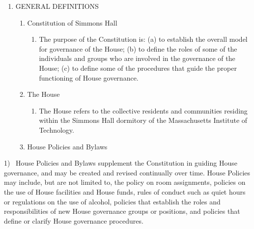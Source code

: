\documentclass[letterpaper]{article}
\newcounter{saveenum}
\newcommand\liststyleWWNumv{%
\renewcommand\theenumi{\Roman{enumi}}
\renewcommand\theenumii{\arabic{enumii}}
\renewcommand\theenumiii{\arabic{enumiii}}
\renewcommand\theenumiv{\arabic{enumiv}}
\renewcommand\labelenumi{\theenumi.}
\renewcommand\labelenumii{\theenumii.}
\renewcommand\labelenumiii{\theenumiii)}
\renewcommand\labelenumiv{\theenumiv.}
}
\begin{document}
\clearpage
\liststyleWWNumv
\setcounter{saveenum}{\value{enumi}}
\begin{enumerate}
\setcounter{enumi}{\value{saveenum}}
\item GENERAL DEFINITIONS 

\begin{enumerate}
\item Constitution of Simmons Hall 

\begin{enumerate}
\item The purpose of the Constitution is: (a) to establish the overall
model for governance of the House; (b) to define the roles of some of
the individuals and groups who are involved in the governance of the
House; (c) to define some of the procedures that guide the proper
functioning of House governance.
\end{enumerate}
\item The House 

\begin{enumerate}
\item The House refers to the collective residents and communities
residing within the Simmons Hall dormitory of the Massachusetts
Institute of Technology. 
\end{enumerate}
\item House Policies and Bylaws
\end{enumerate}
\end{enumerate}
1) \ House Policies and Bylaws supplement the Constitution in guiding
House governance, and may be created and revised continually over time.
House Policies may include, but are not limited to, the policy on room
assignments, policies on the use of House facilities and House funds,
rules of conduct such as quiet hours or regulations on the use of
alcohol, policies that establish the roles and responsibilities of new
House governance groups or positions, and policies that define or
clarify House governance procedures.


\bigskip
\end{document}
